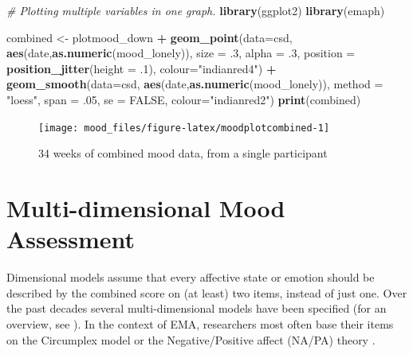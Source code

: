 \documentclass[]{book}
\newenvironment{Shaded}{\begin{snugshade}}{\end{snugshade}}
\newcommand{\KeywordTok}[1]{\textcolor[rgb]{0.13,0.29,0.53}{\textbf{#1}}}
\newcommand{\DataTypeTok}[1]{\textcolor[rgb]{0.13,0.29,0.53}{#1}}
\newcommand{\DecValTok}[1]{\textcolor[rgb]{0.00,0.00,0.81}{#1}}
\newcommand{\StringTok}[1]{\textcolor[rgb]{0.31,0.60,0.02}{#1}}
\newcommand{\CommentTok}[1]{\textcolor[rgb]{0.56,0.35,0.01}{\textit{#1}}}
\newcommand{\OtherTok}[1]{\textcolor[rgb]{0.56,0.35,0.01}{#1}}
\newcommand{\OperatorTok}[1]{\textcolor[rgb]{0.81,0.36,0.00}{\textbf{#1}}}
\newcommand{\NormalTok}[1]{#1}
\begin{document}
\begin{Shaded}
\begin{Highlighting}[]
\CommentTok{# Plotting multiple variables in one graph.}
\KeywordTok{library}\NormalTok{(ggplot2) }
\KeywordTok{library}\NormalTok{(emaph)}

\NormalTok{combined <-}\StringTok{ }\NormalTok{plotmood_down }\OperatorTok{+}\StringTok{ }
\StringTok{  }\KeywordTok{geom_point}\NormalTok{(}\DataTypeTok{data=}\NormalTok{csd, }\KeywordTok{aes}\NormalTok{(date,}\KeywordTok{as.numeric}\NormalTok{(mood_lonely)), }
    \DataTypeTok{size =}\NormalTok{ .}\DecValTok{3}\NormalTok{, }\DataTypeTok{alpha =}\NormalTok{ .}\DecValTok{3}\NormalTok{, }\DataTypeTok{position =} \KeywordTok{position_jitter}\NormalTok{(}\DataTypeTok{height =}\NormalTok{ .}\DecValTok{1}\NormalTok{),}
    \DataTypeTok{colour=}\StringTok{"indianred4"}\NormalTok{) }\OperatorTok{+}\StringTok{ }
\StringTok{  }\KeywordTok{geom_smooth}\NormalTok{(}\DataTypeTok{data=}\NormalTok{csd, }\KeywordTok{aes}\NormalTok{(date,}\KeywordTok{as.numeric}\NormalTok{(mood_lonely)), }
    \DataTypeTok{method =} \StringTok{"loess"}\NormalTok{, }\DataTypeTok{span =}\NormalTok{ .}\DecValTok{05}\NormalTok{, }\DataTypeTok{se =} \OtherTok{FALSE}\NormalTok{, }\DataTypeTok{colour=}\StringTok{"indianred2"}\NormalTok{)}
\KeywordTok{print}\NormalTok{(combined)}
\end{Highlighting}
\end{Shaded}

\begin{figure}

{\centering \texttt{[image: mood\_files/figure-latex/moodplotcombined-1]} 

}

\caption{34 weeks of combined mood data, from a single participant}\label{fig:moodplotcombined}
\end{figure}

\section{Multi-dimensional Mood
Assessment}\label{multi-dimensional-mood-assessment}


Dimensional models assume that every affective state or emotion should
be described by the combined score on (at least) two items, instead of
just one. Over the past decades several multi-dimensional models have
been specified (for an overview, see \citet{sander2009}). In the context
of EMA, researchers most often base their items on the Circumplex model
\citep{russell1980circumplex} or the Negative/Positive affect (NA/PA)
theory \citep{watson1985}.
\end{document}
